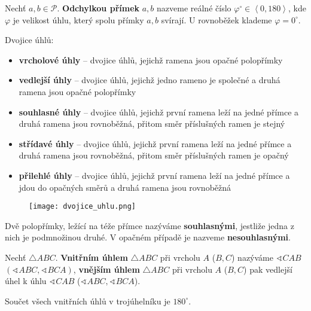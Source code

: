 \begin{definition}
  Nechť $a,b\in \mathscr P.$ \textbf{Odchylkou přímek} $a,b$ nazveme reálné číslo $\varphi^\circ\in \left <0, 180\right>$, kde $\varphi$ je velikost úhlu, který spolu přímky $a,b$ svírají. U rovnoběžek klademe $\varphi = 0^\circ.$
\end{definition}

\begin{definition}
  Dvojice úhlů:
  \begin{itemize}
    \item \textbf{vrcholové úhly} -- dvojice úhlů, jejichž ramena jsou opačné polopřímky
    \item \textbf{vedlejší úhly} --	dvojice úhlů, jejichž jedno rameno je společné a druhá ramena jsou opačné polopřímky
    \item \textbf{souhlasné úhly} -- dvojice úhlů, jejichž první ramena leží na jedné přímce a druhá ramena jsou rovnoběžná, přitom směr příslušných ramen je stejný
    \item \textbf{střídavé úhly}	-- dvojice úhlů, jejichž první ramena leží na jedné přímce a druhá ramena jsou rovnoběžná, přitom směr příslušných ramen je opačný
    \item \textbf{přilehlé úhly} -- dvojice úhlů, jejichž první ramena leží na jedné přímce a jdou do opačných směrů a druhá ramena jsou rovnoběžná
  \end{itemize}
  \begin{figure}[h!]
    \centering
    \texttt{[image: dvojice\_uhlu.png]}
  \end{figure}
\end{definition}


\begin{definition}
  Dvě polopřímky, ležící na téže přímce nazýváme \textbf{souhlasnými}, jestliže jedna z nich je podmnožinou druhé. V opačném případě je nazveme \textbf{nesouhlasnými}.
\end{definition}

\begin{definition}
  Nechť $\triangle ABC$. \textbf{Vnitřním úhlem} $\triangle ABC$ při vrcholu $A$ ($B, C$) nazýváme $\sphericalangle CAB$ $(\sphericalangle ABC, \sphericalangle BCA)$, \textbf{vnějším úhlem} $\triangle ABC$ při vrcholu $A$ ($B, C$) pak vedlejší úhel k úhlu $\sphericalangle CAB$ ($\sphericalangle ABC, \sphericalangle BCA$).
\end{definition}

\begin{veta}
  Součet všech vnitřních úhlů v trojúhelníku je $180^\circ$.
\end{veta}

